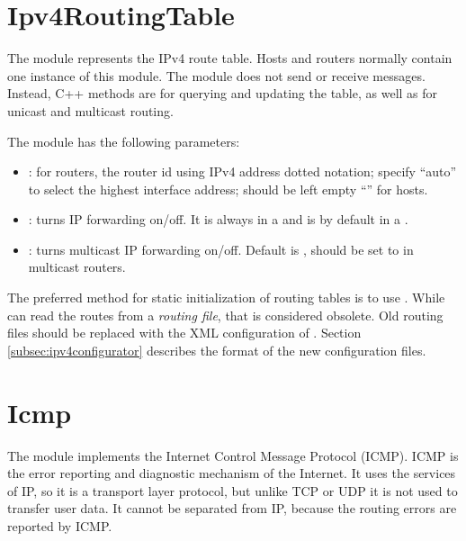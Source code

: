 \section{Ipv4RoutingTable}
\label{sec:ipv4:ipv4routingtable}

The  module represents the IPv4 route table.
Hosts and routers normally contain one instance of this module.
The  module does not send or receive messages.
Instead, C++ methods are for querying and updating the table, as well as for
unicast and multicast routing.

The  module has the following parameters:

\begin{itemize}
  \item {}: for routers, the router id using IPv4 address dotted notation;
      specify ``auto'' to select the highest interface address; should be left empty ``''
      for hosts.
  \item {}: turns IP forwarding on/off. It is always 
      in a  and is  by default in a .
  \item {}: turns multicast IP forwarding on/off.
    Default is , should be set to  in multicast routers.
\end{itemize}

The preferred method for static initialization of routing tables is to use
. While 
can read the routes from a \textit{routing file}, that is considered obsolete.
Old routing files should be replaced with the XML configuration of
. Section \ref{subsec:ipv4configurator}
describes the format of the new configuration files.


\section{Icmp}
\label{sec:ipv4:icmp}

The  module implements the Internet Control Message Protocol
(ICMP). ICMP is the error reporting and diagnostic mechanism of the Internet.
It uses the services of IP, so it is a transport layer protocol, but unlike TCP
or UDP it is not used to transfer user data. It cannot be separated from
IP, because the routing errors are reported by ICMP.

